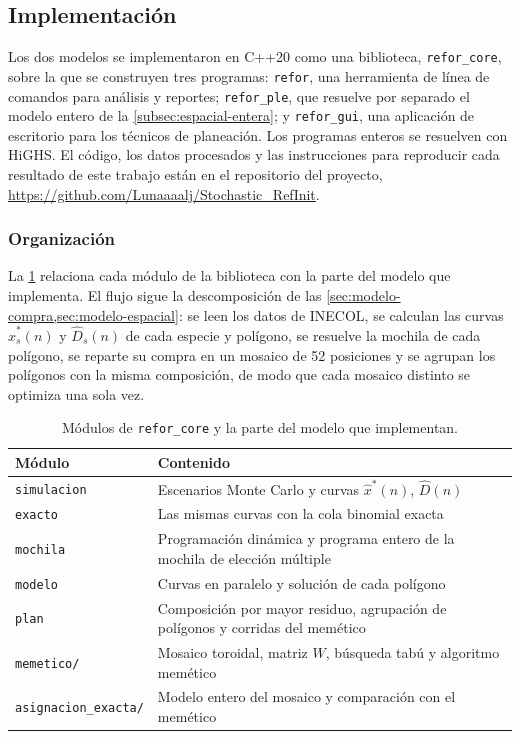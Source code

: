 \subsection{Implementación}
\label{sec:implementacion}

Los dos modelos se implementaron en C++20 como una biblioteca, \texttt{refor\_core}, sobre la que se construyen tres programas: \texttt{refor}, una herramienta de línea de comandos para análisis y reportes; \texttt{refor\_ple}, que resuelve por separado el modelo entero de la \cref{subsec:espacial-entera}; y \texttt{refor\_gui}, una aplicación de escritorio para los técnicos de planeación. Los programas enteros se resuelven con HiGHS. El código, los datos procesados y las instrucciones para reproducir cada resultado de este trabajo están en el repositorio del proyecto, \url{https://github.com/Lunaaaalj/Stochastic_RefInit}.

\subsubsection{Organización}
\label{subsec:impl-organizacion}

La \cref{tab:modulos} relaciona cada módulo de la biblioteca con la parte del modelo que implementa. El flujo sigue la descomposición de las \cref{sec:modelo-compra,sec:modelo-espacial}: se leen los datos de INECOL, se calculan las curvas $\hat{x}_s^{*}(n)$ y $\hat{D}_s(n)$ de cada especie y polígono, se resuelve la mochila de cada polígono, se reparte su compra en un mosaico de 52 posiciones y se agrupan los polígonos con la misma composición, de modo que cada mosaico distinto se optimiza una sola vez.

\begin{table}[t]
\centering
\caption{Módulos de \texttt{refor\_core} y la parte del modelo que implementan.}
\label{tab:modulos}
\small
\begin{tabularx}{\columnwidth}{@{}>{\RaggedRight\arraybackslash}p{2.6cm}>{\RaggedRight\arraybackslash}X@{}}
\toprule
Módulo & Contenido \\
\midrule
\texttt{simulacion} & Escenarios Monte Carlo y curvas $\hat{x}^{*}(n)$, $\hat{D}(n)$ \\
\texttt{exacto} & Las mismas curvas con la cola binomial exacta \\
\texttt{mochila} & Programación dinámica y programa entero de la mochila de elección múltiple \\
\texttt{modelo} & Curvas en paralelo y solución de cada polígono \\
\texttt{plan} & Composición por mayor residuo, agrupación de polígonos y corridas del memético \\
\texttt{memetico/} & Mosaico toroidal, matriz $W$, búsqueda tabú y algoritmo memético \\
\texttt{asignacion\_exacta/} & Modelo entero del mosaico y comparación con el memético \\
\bottomrule
\end{tabularx}
\end{table}

